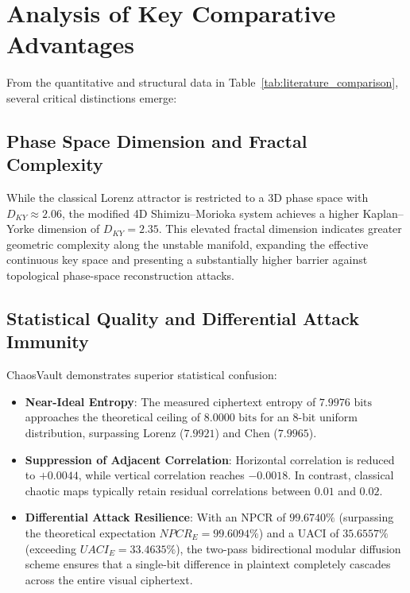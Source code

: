 \documentclass[12pt,a4paper,oneside]{report}
\begin{document}
\section{Analysis of Key Comparative Advantages}
From the quantitative and structural data in Table~\ref{tab:literature_comparison}, several critical distinctions emerge:

\subsection{Phase Space Dimension and Fractal Complexity}
While the classical Lorenz attractor is restricted to a 3D phase space with $D_{KY} \approx 2.06$, the modified 4D Shimizu--Morioka system achieves a higher Kaplan--Yorke dimension of $D_{KY} = 2.35$. This elevated fractal dimension indicates greater geometric complexity along the unstable manifold, expanding the effective continuous key space and presenting a substantially higher barrier against topological phase-space reconstruction attacks.

\subsection{Statistical Quality and Differential Attack Immunity}
ChaosVault demonstrates superior statistical confusion:
\begin{itemize}
    \item \textbf{Near-Ideal Entropy}: The measured ciphertext entropy of $7.9976\text{ bits}$ approaches the theoretical ceiling of $8.0000\text{ bits}$ for an 8-bit uniform distribution, surpassing Lorenz ($7.9921$) and Chen ($7.9965$).
    \item \textbf{Suppression of Adjacent Correlation}: Horizontal correlation is reduced to $+0.0044$, while vertical correlation reaches $-0.0018$. In contrast, classical chaotic maps typically retain residual correlations between $0.01$ and $0.02$.
    \item \textbf{Differential Attack Resilience}: With an NPCR of $99.6740\%$ (surpassing the theoretical expectation $NPCR_E = 99.6094\%$) and a UACI of $35.6557\%$ (exceeding $UACI_E = 33.4635\%$), the two-pass bidirectional modular diffusion scheme ensures that a single-bit difference in plaintext completely cascades across the entire visual ciphertext.
\end{itemize}
\end{document}

